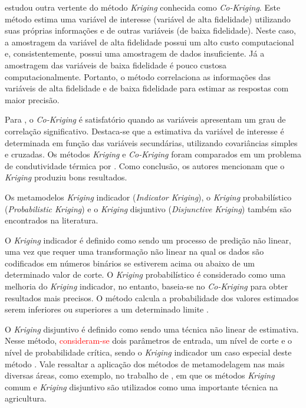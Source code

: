  estudou outra vertente do método {\it Kriging} conhecida como \textit{Co-Kriging}. Este método estima uma variável de interesse (variável de alta fidelidade) utilizando suas próprias informações e de outras variáveis (de baixa fidelidade). Neste caso, a amostragem da variável de alta fidelidade possui um alto custo computacional e, consistentemente, possui uma amostragem de dados insuficiente. Já a amostragem das variáveis de baixa fidelidade é pouco custosa computacionalmente. Portanto, o método correlaciona as informações das variáveis de alta fidelidade e de baixa fidelidade para estimar as respostas com maior precisão.

Para , o \textit{Co-Kriging} é satisfatório quando as variáveis apresentam um grau de correlação significativo. Destaca-se que a estimativa da variável de interesse é determinada em função das variáveis secundárias, utilizando covariâncias simples e cruzadas. Os métodos {\it Kriging} e \textit{Co-Kriging} foram comparados em um problema de condutividade térmica por . Como conclusão, os autores mencionam que o {\it Kriging} produziu bons resultados.

Os metamodelos {\it Kriging} indicador (\textit{Indicator Kriging}), o {\it Kriging} probabilístico (\textit{Probabilistic Kriging}) e o {\it Kriging} disjuntivo (\textit{Disjunctive Kriging}) também são encontrados na literatura. 

O {\it Kriging} indicador é definido como sendo um processo de predição não linear, uma vez que requer uma transformação não linear na qual os dados são codificados em números binários se estiverem acima ou abaixo de um determinado valor de corte. O {\it Kriging} probabilístico é considerado como uma melhoria do {\it Kriging} indicador, no entanto, baseia-se no \textit{Co-Kriging} para obter resultados mais precisos. O método calcula a probabilidade dos valores estimados serem inferiores ou superiores a um determinado limite \cite{ASA2012}.

O {\it Kriging} disjuntivo é definido como sendo uma técnica não linear de estimativa. Nesse método, \textcolor{red}{consideram-se} dois parâmetros de entrada, um nível de corte e o nível de probabilidade crítica, sendo o {\it Kriging} indicador um caso especial deste método \cite{ahmed2001}. Vale ressaltar a aplicação dos métodos de metamodelagem nas mais diversas áreas, como exemplo, no trabalho de , em que os métodos {\it Kriging} comum e {\it Kriging} disjuntivo são utilizados como uma importante técnica na agricultura. 

